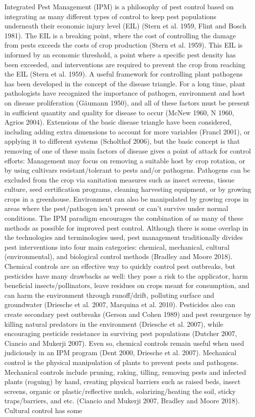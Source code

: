 \documentclass[12pt,final,CPage]{ufthesis}
\begin{document}
{  Integrated Pest Management (IPM) is a philosophy of pest control based on integrating as many different types of control to keep pest populations underneath their economic injury level (EIL) (Stern et al. 1959, Flint and Bosch 1981). The EIL is a breaking point, where the cost of controlling the damage from pests exceeds the costs of crop production (Stern et al. 1959). This EIL is informed by an economic threshold, a point where a specific pest density has been exceeded, and interventions are required to prevent the crop from reaching the EIL (Stern et al. 1959). A useful framework for controlling plant pathogens has been developed in the concept of the disease triangle. For a long time, plant pathologists have recognized the importance of pathogen, environment and host on disease proliferation (Gäumann 1950), and all of these factors must be present in sufficient quantity and quality for disease to occur (McNew 1960, N 1960, Agrios 2004). Extensions of the basic disease triangle have been considered, including adding extra dimensions to account for more variables (Francl 2001), or applying it to different systems (Scholthof 2006), but the basic concept is that removing of one of these main factors of disease gives a point of attack for control efforts: Management may focus on removing a suitable host by crop rotation, or by using cultivars resistant/tolerant to pests and/or pathogens. Pathogens can be excluded from the crop via sanitation measures such as insect screens, tissue culture, seed certification programs, cleaning harvesting equipment, or by growing crops in a greenhouse. Environment can also be manipulated by growing crops in areas where the pest/pathogen isn't present or can't survive under normal conditions. The IPM paradigm encourages the combination of as many of these methods as possible for improved pest control. Although there is some overlap in the technologies and terminologies used, pest management traditionally divides pest interventions into four main categories: chemical, mechanical, cultural (environmental), and biological control methods (Bradley and Moore 2018). Chemical controls are an effective way to quickly control pest outbreaks, but pesticides have many drawbacks as well: they pose a risk to the applicator, harm beneficial insects/pollinators, leave residues on crops meant for consumption, and can harm the environment through runoff/drift, polluting surface and groundwater (Driesche et al. 2007, Marquina et al. 2010). Pesticides also can create secondary pest outbreaks (Gerson and Cohen 1989) and pest resurgence by killing natural predators in the environment (Driesche et al. 2007), while encouraging pesticide resistance in surviving pest populations (Dutcher 2007, Ciancio and Mukerji 2007). Even so, chemical controls remain useful when used judiciously in an IPM program (Dent 2000, Driesche et al. 2007). Mechanical control is the physical manipulation of plants to prevent pests and pathogens. Mechanical controls include pruning, raking, tilling, removing pests and infected plants (roguing) by hand, creating physical barriers such as raised beds, insect screens, organic or plastic/reflective mulch, solarizing/heating the soil, sticky traps/barriers, and etc. (Ciancio and Mukerji 2007, Bradley and Moore 2018). Cultural control has some }
\end{document}
